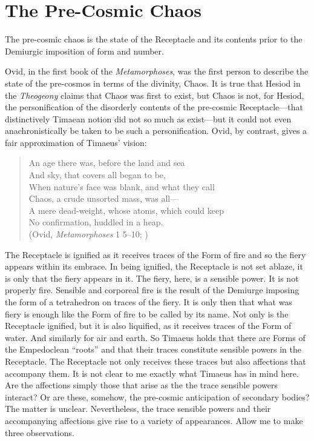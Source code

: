 \section{The Pre-Cosmic Chaos} %
\label{sec:the_pre_cosmic_chaos}

The pre-cosmic chaos is the state of the Receptacle and its contents prior to the Demiurgic imposition of form and number. 

Ovid, in the first book of the \emph{Metamorphoses}, was the first person to describe the state of the pre-cosmos in terms of the divinity, Chaos. It is true that Hesiod in the \emph{Theogeony} claims that Chaos was first to exist, but Chaos is not, for Hesiod, the personification of the disorderly contents of the pre-cosmic Receptacle---that distinctively Timaean notion did not so much as exist---but it could not even anachronistically be taken to be such a personification. Ovid, by contrast, gives a fair approximation of Timaeus' vision:
\begin{verse}
	An age there was, before the land and sea\\
	And sky, that covers all began to be,\\
	When nature's face was blank, and what they call\\
	Chaos, a crude unsorted mass, was all---\\
	A mere dead-weight, whose atoms, which could keep\\
	No confirmation, huddled in a heap.\\
	(Ovid, \emph{Metamorphoses} 1 5--10; \citealt[1]{Watts:1980aa})
\end{verse}

The Receptacle is ignified as it receives traces of the Form of fire and so the fiery appears within its embrace. In being ignified, the Receptacle is not set ablaze, it is only that the fiery appears in it. The fiery, here, is a sensible power. It is not properly fire. Sensible and corporeal fire is the result of the Demiurge imposing the form of a tetrahedron on traces of the fiery. It is only then that what was fiery is enough like the Form of fire to be called by its name. Not only is the Receptacle ignified, but it is also liquified, as it receives traces of the Form of water. And similarly for air and earth. So Timaeus holds that there are Forms of the Empedoclean ``roots'' and that their traces constitute sensible powers in the Receptacle. The Receptacle not only receives these traces but also affections that accompany them. It is not clear to me exactly what Timaeus has in mind here. Are the affections simply those that arise as the the trace sensible powers interact? Or are these, somehow, the pre-cosmic anticipation of secondary bodies? The matter is unclear. Nevertheless, the trace sensible powers and their accompanying affections give rise to a variety of appearances. Allow me to make three observations.

